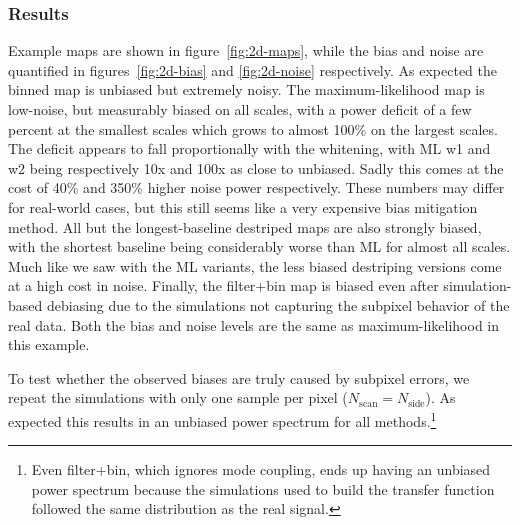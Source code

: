 \documentclass{aa}
\begin{document}
\subsubsection{Results}
\label{sec:2d-results}
Example maps are shown in figure~\ref{fig:2d-maps},
while the bias and noise are quantified in figures~\ref{fig:2d-bias} and \ref{fig:2d-noise}
respectively.
As expected the binned map is unbiased but extremely noisy. The maximum-likelihood
map is low-noise, but measurably biased on all scales, with a power deficit of
a few percent at the smallest scales which grows to almost 100\% on the largest scales.
The deficit appears to fall proportionally with the whitening, with ML w1 and w2
being respectively 10x and 100x as close to unbiased. Sadly this comes at the cost of
40\% and 350\% higher noise power respectively. These numbers may differ for real-world
cases, but this still seems like a very expensive bias mitigation method.
All but the longest-baseline destriped maps are also strongly biased,
with the shortest baseline being considerably worse than ML for almost all scales.
Much like we saw with the ML variants, the less biased destriping versions
come at a high cost in noise. Finally, the filter+bin map is biased even after simulation-based
debiasing due to the simulations not capturing the subpixel behavior of the real data.
Both the bias and noise levels are the same as maximum-likelihood in this example.

To test whether the observed biases are truly caused by subpixel errors, we repeat
the simulations with only one sample per pixel ($N_\text{scan} = N_\text{side}$).
As expected this results in an unbiased power spectrum for all methods.\footnote{
	Even filter+bin, which ignores mode coupling, ends up having an unbiased power
	spectrum because the simulations used to build the transfer function followed
	the same distribution as the real signal.
}
\end{document}
